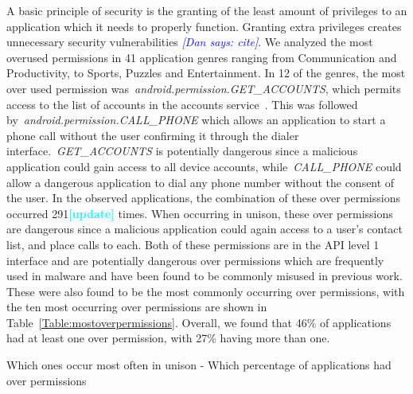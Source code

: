 \documentclass{sig-alternate}
\newcommand{\todo}[1]{\textcolor{cyan}{\textbf{[#1]}}}
\newcommand{\dan}[1]{\textcolor{blue}{{\it [Dan says: #1]}}}
\begin{document}
A basic principle of security is the granting of the least amount of privileges to an application which it needs to properly function. Granting extra privileges creates unnecessary security vulnerabilities \dan{cite}. We analyzed the most overused permissions in 41 application genres ranging from Communication and Productivity, to Sports, Puzzles and Entertainment. In 12 of the genres, the most over used permission was~\emph{android.permission.GET\_ACCOUNTS}, which permits access to the list of accounts in the accounts service~\cite{manifest_url}. This was followed by~\emph{android.permission.CALL\_PHONE} which allows an application to start a phone call without the user confirming it through the dialer interface.~\emph{GET\_ACCOUNTS} is potentially dangerous since a malicious application could gain access to all device accounts, while~\emph{CALL\_PHONE} could allow a dangerous application to dial any phone number without the consent of the user. In the observed applications, the combination of these over permissions occurred 291\todo{update} times. When occurring in unison, these over permissions are dangerous since a malicious application could again access to a user's contact list, and place calls to each. Both of these permissions are in the API level 1 interface and are potentially dangerous over permissions which are frequently used in malware and have been found to be commonly misused in previous work\cite{qsconf_key}. These were also found to be the most commonly occurring over permissions, with the ten most occurring over permissions are shown in Table~\ref{Table:mostoverpermissions}. Overall, we found that 46\% of applications had at least one over permission, with 27\% having more than one.
 

Which ones occur most often in unison
- Which percentage of applications had over permissions
\end{document}

